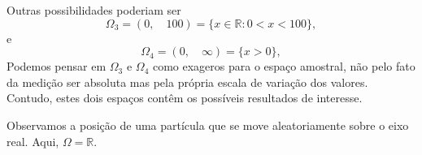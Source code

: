 \begin{frame}
%	
%	

%	

\begin{exem}
Outras possibilidades poderiam ser  
$$\Omega_3 = (0 , \quad 100)  = \{ x \in \mathbb{R}: 0< x < 100 \},$$ e
$$\Omega_4 = (0 , \quad \infty)  = \{ x > 0 \},$$ 
Podemos pensar em $\Omega_3$ e $\Omega_4$ como exageros para o espaço amostral, não pelo fato da medição ser absoluta mas pela própria escala de variação dos valores. Contudo, estes dois espaços contêm os possíveis resultados de interesse. 
\end{exem}

\begin{exem}
Observamos a posição de uma partícula que se move aleatoriamente sobre o eixo real. Aqui, $\Omega =\mathbb{R}.$
\end{exem}

\end{frame}




